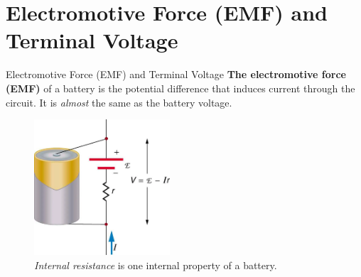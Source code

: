 \documentclass{beamer}
\begin{document}
\section{Electromotive Force (EMF) and Terminal Voltage}

\begin{frame}{Electromotive Force (EMF) and Terminal Voltage}
\small
\textbf{\alert{The electromotive force (EMF)}} of a battery is the potential difference that induces current through the circuit.  It is \textit{almost} the same as the battery voltage.
\begin{figure}
\includegraphics[width=0.45\textwidth]{figures/internal_r.png}
\caption{\label{fig:internal_r} \textit{Internal resistance} is one internal property of a battery.}
\end{figure}
\end{frame}
\end{document}

